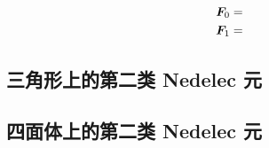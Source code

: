 \documentclass{article}
\begin{document}
\begin{align*}
    {\boldsymbol F}_0 = \\
    {\boldsymbol F}_1 = 
\end{align*}

\subsection{三角形上的第二类 Nedelec 元}
\subsection{四面体上的第二类 Nedelec 元}
\cite{fealpy}


\end{document}

